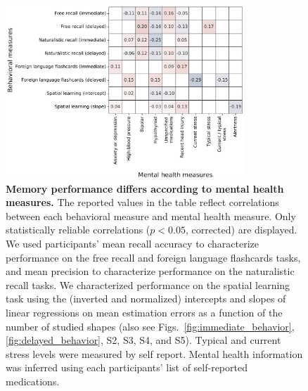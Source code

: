 \documentclass[10pt]{article}
\newcommand{\frDetail}{S2}
\newcommand{\natDetail}{S3}
\newcommand{\vocabDetail}{S4}
\newcommand{\spatialDetail}{S5}
\begin{document}
\begin{figure}[tp]
\centering
\includegraphics[width=0.8\textwidth]{figs/corr_MH}
\caption{\textbf{Memory performance differs according to mental health
    measures.}  The reported values in the table reflect correlations
  between each behavioral measure and mental health measure.
  Only statistically reliable correlations ($p < 0.05$, corrected) are displayed. 
  We used participants' mean recall accuracy to characterize
  performance on the free recall and
  foreign language flashcards tasks, and mean precision to
  characterize performance on the naturalistic recall tasks.  We
  characterized performance on the spatial learning task using the
  (inverted and normalized)
  intercepts and slopes of linear regressions on mean estimation
  errors as a function of the number of studied shapes (also see
  Figs.~\ref{fig:immediate_behavior}, \ref{fig:delayed_behavior},
  \frDetail, \natDetail, \vocabDetail, and \spatialDetail).  Typical
  and current stress levels were measured by self report.  Mental
  health information was inferred using each participants' list of
  self-reported medications.}
\label{fig:mh_corr}
\end{figure}
\end{document}
